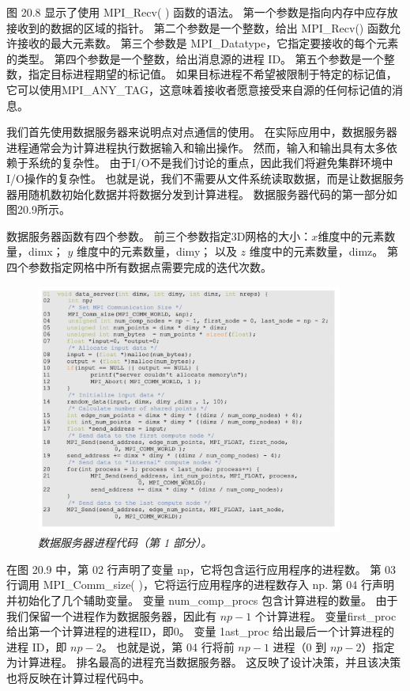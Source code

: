 图 20.8 显示了使用 MPI\_Recv( ) 函数的语法。 第一个参数是指向内存中应存放接收到的数据的区域的指针。 
第二个参数是一个整数，给出 MPI\_Recv() 函数允许接收的最大元素数。 
第三个参数是 MPI\_Datatype，它指定要接收的每个元素的类型。 第四个参数是一个整数，给出消息源的进程 ID。 
第五个参数是一个整数，指定目标进程期望的标记值。 
如果目标进程不希望被限制于特定的标记值，它可以使用MPI\_ANY\_TAG，这意味着接收者愿意接受来自源的任何标记值的消息。

我们首先使用数据服务器来说明点对点通信的使用。 在实际应用中，数据服务器进程通常会为计算进程执行数据输入和输出操作。 
然而，输入和输出具有太多依赖于系统的复杂性。 由于I/O不是我们讨论的重点，因此我们将避免集群环境中I/O操作的复杂性。 
也就是说，我们不需要从文件系统读取数据，而是让数据服务器用随机数初始化数据并将数据分发到计算进程。 
数据服务器代码的第一部分如图20.9所示。

数据服务器函数有四个参数。 前三个参数指定3D网格的大小：$x$维度中的元素数量，dimx； $y$ 维度中的元素数量，dimy； 
以及 $z$ 维度中的元素数量，dimz。 第四个参数指定网格中所有数据点需要完成的迭代次数。

\begin{figure}[H]
	\centering
	\includegraphics[width=0.9\textwidth]{figs/F20.9.png}
	\caption{\textit{数据服务器进程代码（第 1 部分）。}}
\end{figure}

在图 20.9 中，第 02 行声明了变量 np，它将包含运行应用程序的进程数。 
第 03 行调用 MPI\_Comm\_size( )，它将运行应用程序的进程数存入 np. 第 04 行声明并初始化了几个辅助变量。 
变量 num\_comp\_procs 包含计算进程的数量。 由于我们保留一个进程作为数据服务器，因此有 $n p-1$ 个计算进程。 
变量first\_proc给出第一个计算进程的进程ID，即0。 变量 1ast\_proc 给出最后一个计算进程的进程 ID，即 $n p-2$。 
也就是说，第 04 行将前 $n p-1$ 进程（0 到 $n p-2$）指定为计算进程。 排名最高的进程充当数据服务器。 
这反映了设计决策，并且该决策也将反映在计算过程代码中。


